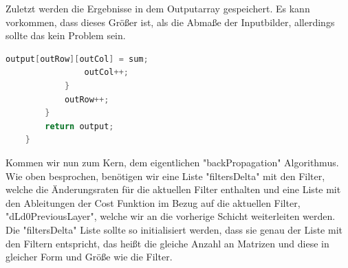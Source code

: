 \documentclass[12pt]{article}
\begin{document}
Zuletzt werden die Ergebnisse in dem Outputarray gespeichert. Es kann vorkommen, dass dieses Größer ist, als die Abmaße der Inputbilder, allerdings sollte das kein Problem sein. 
\begin{lstlisting}[language=Java]
                output[outRow][outCol] = sum;
                outCol++;
            }
            outRow++;
        }
        return output;
    }
\end{lstlisting}

Kommen wir nun zum Kern, dem eigentlichen "backPropagation" Algorithmus. Wie oben besprochen, benötigen wir eine Liste "filtersDelta" mit den Filter, welche die Änderungsraten für die aktuellen Filter enthalten und eine Liste mit den Ableitungen der Cost Funktion im Bezug auf die aktuellen Filter, "dLd0PreviousLayer", welche wir an die vorherige Schicht weiterleiten werden.
Die "filtersDelta" Liste sollte so initialisiert werden, dass sie genau der Liste mit den Filtern entspricht, das heißt die gleiche Anzahl an Matrizen und diese in gleicher Form und Größe wie die Filter.
\end{document}
